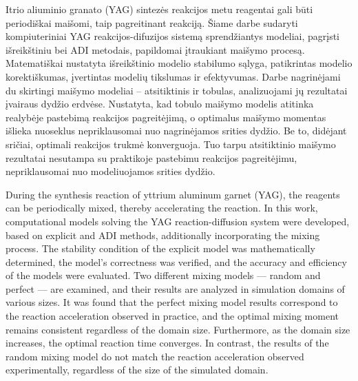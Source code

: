 
Itrio aliuminio granato (YAG) sintezės reakcijos metu reagentai gali būti periodiškai maišomi, taip pagreitinant reakciją. Šiame darbe sudaryti kompiuteriniai YAG reakcijos-difuzijos sistemą sprendžiantys modeliai, pagrįsti išreikštiniu bei ADI metodais, papildomai įtraukiant maišymo procesą. Matematiškai nustatyta išreikštinio modelio stabilumo sąlyga, patikrintas modelio korektiškumas, įvertintas modelių tikslumas ir efektyvumas. Darbe nagrinėjami du skirtingi maišymo modeliai -- atsitiktinis ir tobulas, analizuojami jų rezultatai įvairaus dydžio erdvėse. Nustatyta, kad tobulo maišymo modelis atitinka realybėje pastebimą reakcijos pagreitėjimą, o optimalus maišymo momentas išlieka nuoseklus nepriklausomai nuo nagrinėjamos srities dydžio. Be to, didėjant sričiai, optimali reakcijos trukmė konverguoja. Tuo tarpu atsitiktinio maišymo rezultatai nesutampa su praktikoje pastebimu reakcijos pagreitėjimu, nepriklausomai nuo modeliuojamos srities dydžio.

\newpage 


During the synthesis reaction of yttrium aluminum garnet (YAG), the reagents can be periodically mixed, thereby accelerating the reaction. In this work, computational models solving the YAG reaction-diffusion system were developed, based on explicit and ADI methods, additionally incorporating the mixing process. The stability condition of the explicit model was mathematically determined, the model's correctness was verified, and the accuracy and efficiency of the models were evaluated. Two different mixing models — random and perfect — are examined, and their results are analyzed in simulation domains of various sizes. It was found that the perfect mixing model results correspond to the reaction acceleration observed in practice, and the optimal mixing moment remains consistent regardless of the domain size. Furthermore, as the domain size increases, the optimal reaction time converges. In contrast, the results of the random mixing model do not match the reaction acceleration observed experimentally, regardless of the size of the simulated domain.

\newpage 
